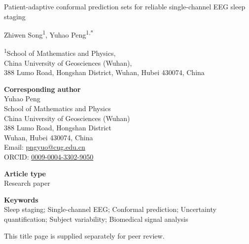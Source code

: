 \documentclass[12pt]{article}
\begin{document}
\pagestyle{empty}

\begin{center}
{\LARGE\bfseries
\parbox{0.96\textwidth}{\centering Patient-adaptive conformal prediction sets for reliable single-channel EEG sleep staging}\par}
\vspace{2.5em}
{\large Zhiwen Song\textsuperscript{1}, Yuhao Peng\textsuperscript{1,*}\par}
\vspace{1.25em}
{\small
\textsuperscript{1}School of Mathematics and Physics,\\
China University of Geosciences (Wuhan),\\
388 Lumo Road, Hongshan District, Wuhan, Hubei 430074, China\par}
\end{center}

\vspace{3em}
\noindent\textbf{Corresponding author}\\
Yuhao Peng\\
School of Mathematics and Physics\\
China University of Geosciences (Wuhan)\\
388 Lumo Road, Hongshan District\\
Wuhan, Hubei 430074, China\\
Email: \href{mailto:pngyuo@cug.edu.cn}{pngyuo@cug.edu.cn}\\
ORCID: \href{https://orcid.org/0009-0004-3302-9050}{0009-0004-3302-9050}

\vspace{2em}
\noindent\textbf{Article type}\\
Research paper

\vspace{2em}
\noindent\textbf{Keywords}\\
Sleep staging; Single-channel EEG; Conformal prediction; Uncertainty quantification; Subject variability; Biomedical signal analysis

\vfill
\noindent\small This title page is supplied separately for peer review.
\end{document}
